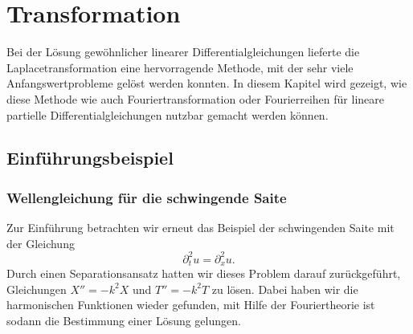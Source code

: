 %
%
%
\chapter{Transformation}
Bei der Lösung gewöhnlicher linearer Differentialgleichungen lieferte die
Laplacetransformation eine hervorragende Methode, mit der sehr
viele Anfangswertprobleme gelöst werden konnten.
In diesem Kapitel wird gezeigt, wie diese Methode wie auch
Fouriertransformation oder Fourierreihen 
für lineare partielle Differentialgleichungen nutzbar gemacht
werden können.

\section{Einführungsbeispiel}
\subsection{Wellengleichung für die schwingende Saite}
Zur Einführung betrachten wir erneut das Beispiel der
schwingenden Saite mit der Gleichung
\[
\partial_t^2u=\partial_x^2u.
\]
Durch einen Separationsansatz hatten wir dieses Problem
darauf zurückgeführt, Gleichungen $X''=-k^2X$ und $T''=-k^2T$
zu lösen.
Dabei haben wir die harmonischen Funktionen wieder gefunden,
mit Hilfe der Fouriertheorie ist sodann die Bestimmung einer Lösung
gelungen.

